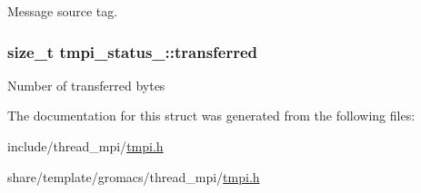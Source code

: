 \-Message source tag. \hypertarget{structtmpi__status___a7b767f29b335b6d832b36a43b21d9adf}{
\subsubsection[{transferred}]{\setlength{\rightskip}{0pt plus 5cm}size\-\_\-t {\bf tmpi\-\_\-status\-\_\-\-::transferred}}}\label{structtmpi__status___a7b767f29b335b6d832b36a43b21d9adf}
\-Number of transferred bytes 

\-The documentation for this struct was generated from the following files\-:\begin{DoxyCompactItemize}
\item 
include/thread\-\_\-mpi/\hyperlink{include_2thread__mpi_2tmpi_8h}{tmpi.\-h}\item 
share/template/gromacs/thread\-\_\-mpi/\hyperlink{share_2template_2gromacs_2thread__mpi_2tmpi_8h}{tmpi.\-h}\end{DoxyCompactItemize}
